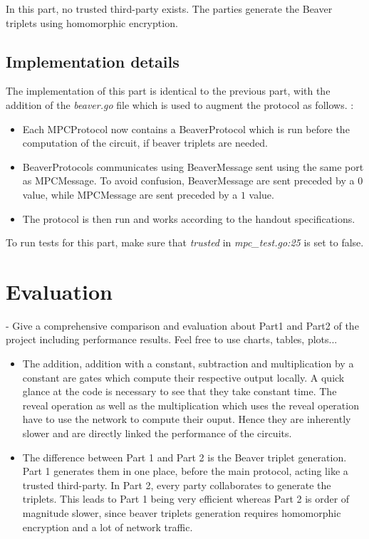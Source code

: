 \documentclass[10pt,conference]{IEEEtran}
\begin{document}
In this part, no trusted third-party exists. The parties generate the Beaver triplets using homomorphic encryption.
\subsection{Implementation details}
The implementation of this part is identical to the previous part, with the addition of the \textit{beaver.go} file which is used to augment the protocol as follows. : 
\begin{itemize}
    \item Each MPCProtocol now contains a BeaverProtocol which is run before the computation of the circuit, if beaver triplets are needed.
    \item BeaverProtocols communicates using BeaverMessage sent using the same port as MPCMessage. To avoid confusion, BeaverMessage are sent preceded by a $0$ value, while MPCMessage are sent preceded by a $1$ value.
    \item The protocol is then run and works according to the handout specifications.
\end{itemize}

To run tests for this part, make sure that \textit{trusted} in \textit{mpc\_test.go:25} is set to false.
\section{Evaluation}
- Give a comprehensive comparison and evaluation about Part1 and Part2 of the project including performance results. Feel free to use charts, tables, plots...
\begin{itemize}
    \item The addition, addition with a constant, subtraction and multiplication by a constant are gates which compute their respective output locally. A quick glance at the code is necessary to see that they take constant time. The reveal operation as well as the multiplication which uses the reveal operation have to use the network to compute their ouput. Hence they are inherently slower and are directly linked the performance of the circuits.
    \item The difference between Part 1 and Part 2 is the Beaver triplet generation. Part 1 generates them in one place, before the main protocol, acting like a trusted third-party. In Part 2, every party collaborates to generate the triplets. This leads to Part 1 being very efficient whereas Part 2 is order of magnitude slower, since beaver triplets generation requires homomorphic encryption and a lot of network traffic. %
\end{itemize}
\end{document}
